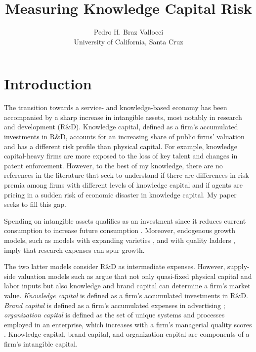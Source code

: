 \documentclass[12pt, letterpaper]{article}
\begin{document}
\title{Measuring Knowledge Capital Risk} %
\author{Pedro H. Braz Vallocci \\ University of California, Santa Cruz} %

\newcommand{\ffo}{dicfullmc10thr10defnob5noa0_8_4t}

\newcommand{\insertfigure}[2]{
\begin{figure}[h!]
  \centering
  \texttt{[image: \\ffo/\#1]}
  \caption{#2}
  \label{fig:#1}
\end{figure}
}


\maketitle %

\onehalfspacing %

\section{Introduction}

The transition towards a service- and knowledge-based economy has been accompanied by a sharp increase in intangible assets, most notably in research and development (R\&D). Knowledge capital, defined as a firm's accumulated investments in R\&D, accounts for an increasing share of public firms' valuation and has a different risk profile than physical capital. For example, knowledge capital-heavy firms are more exposed to the loss of key talent and changes in patent enforcement. However, to the best of my knowledge, there are no references in the literature that seek to understand if there are differences in risk premia among firms with different levels of knowledge capital and if agents are pricing in a sudden risk of economic disaster in knowledge capital. My paper seeks to fill this gap.

Spending on intangible assets qualifies as an investment since it reduces current consumption to increase future consumption \citep{Corrado2009-kd, Corrado2009-hk}. Moreover, endogenous growth models, such as models with expanding varieties \citep{Romer1990-tw}, and with quality ladders \citep{Grossman1991-pz, Atkeson2019-wz}, imply that research expenses can spur growth.

The two latter models consider R\&D as intermediate expenses. However, supply-side valuation models such as \citep{Belo2013-ys} argue that not only quasi-fixed physical capital and labor inputs but also knowledge and brand capital can determine a firm's market value. \emph{Knowledge capital} is defined as a firm's accumulated investments in R\&D. \emph{Brand capital} is defined as a firm's accumulated expenses in advertising \citep{Belo2019-iz}; \emph{organization capital} is defined as the set of unique systems and processes employed in an enterprise, which increases with a firm's managerial quality scores \citep{Eisfeldt2013-ad, Bloom2007-gl}. Knowledge capital, brand capital, and organization capital are components of a firm's intangible capital.
\end{document}
